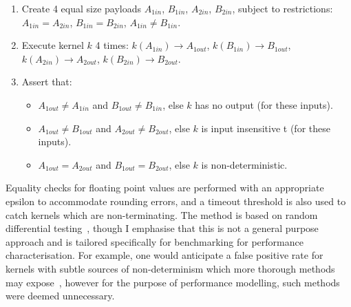 \begin{enumerate}
\item Create 4 equal size payloads $A_{1in}$, $B_{1in}$, $A_{2in}$,
  $B_{2in}$, subject to restrictions: $A_{1in}=A_{2in}$,
  $B_{1in}=B_{2in}$, $A_{1in} \ne B_{1in}$.
\item Execute kernel $k$ 4 times: $k(A_{1in}) \rightarrow A_{1out}$,
  $k(B_{1in}) \rightarrow B_{1out}$,
  $k(A_{2in}) \rightarrow A_{2out}$,
  $k(B_{2in}) \rightarrow B_{2out}$.
\item Assert that:
  \begin{itemize}
  \item $A_{1out} \ne A_{1in}$ and $B_{1out} \ne B_{1in}$, else $k$ has no
  output (for these inputs).%
  \item $A_{1out} \ne B_{1out}$ and $A_{2out} \ne B_{2out}$, else $k$ is input insensitive t (for these inputs).%
  \item $A_{1out}=A_{2out}$ and $B_{1out}=B_{2out}$, else $k$ is
  non-deterministic.
  \end{itemize}
\end{enumerate}

Equality checks for floating point values are performed with an appropriate epsilon to accommodate rounding errors, and a timeout threshold is also used to catch kernels which are non-terminating. The method is based on random differential testing~\cite{McKeeman1998}, though I emphasise that this is not a general purpose approach and is tailored specifically for benchmarking for performance characterisation. For example, one would anticipate a false positive rate for kernels with subtle sources of non-determinism which more thorough methods may expose~\cite{Betts2012,Price2015,Sorensen2016}, however for the purpose of performance modelling, such methods were deemed unnecessary.
